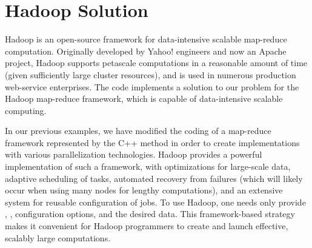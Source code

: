 \documentclass[letterpaper,10pt,openany,oneside]{sphinxmanual}
\begin{document}
\chapter{Hadoop Solution}
\label{hadoop/hadoop::doc}\label{hadoop/hadoop:hadoop-solution}
Hadoop is an open-source framework for data-intensive scalable map-reduce computation. Originally developed by Yahoo! engineers and now an Apache project, Hadoop supports petascale computations in a reasonable amount of time (given sufficiently large cluster resources), and is used in numerous production web-service enterprises. The code  implements a solution to our problem for the Hadoop map-reduce framework, which is capable of data-intensive scalable computing.

In our previous examples, we have modified the coding of a map-reduce framework represented by the C++ method  in order to create implementations with various parallelization technologies. Hadoop provides a powerful implementation of such a framework, with optimizations for large-scale data, adaptive scheduling of tasks, automated recovery from failures (which will likely occur when using many nodes for lengthy computations), and an extensive system for reusable configuration of jobs. To use Hadoop, one needs only provide , , configuration options, and the desired data.  This framework-based strategy makes it convenient for Hadoop programmers to create and launch effective, scalably large computations.
\end{document}
